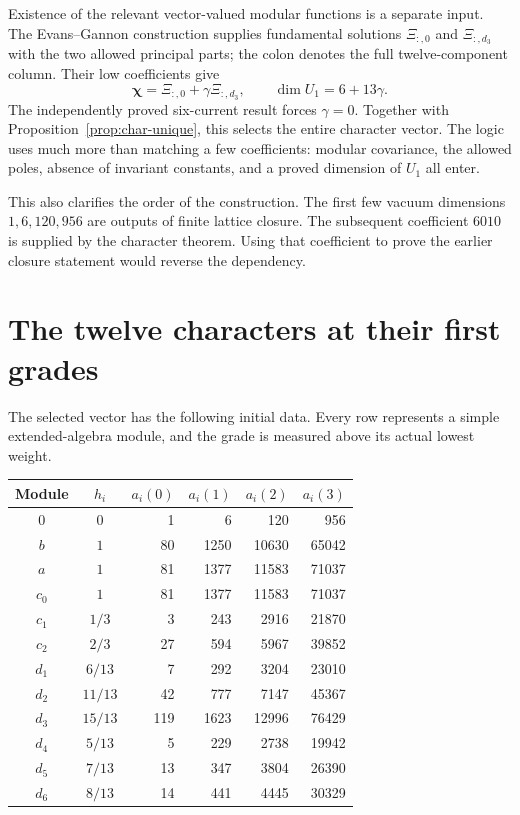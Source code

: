 Existence of the relevant vector-valued modular functions is a
separate input. The Evans--Gannon construction supplies fundamental
solutions $\Xi_{:,0}$ and $\Xi_{:,d_3}$ with the two allowed
principal parts; the colon denotes the full twelve-component column.
Their low coefficients give
\begin{equation}
 \boldsymbol\chi=\Xi_{:,0}+\gamma\Xi_{:,d_3},
 \qquad \dim U_1=6+13\gamma.
 \label{eq:char-gamma}
\end{equation}
The independently proved six-current result forces $\gamma=0$.
Together with Proposition~\ref{prop:char-unique}, this selects the
entire character vector. The logic uses much more than matching a
few coefficients: modular covariance, the allowed poles, absence of
invariant constants, and a proved dimension of $U_1$ all enter.

This also clarifies the order of the construction. The first few
vacuum dimensions $1,6,120,956$ are outputs of finite lattice
closure. The subsequent coefficient $6010$ is supplied by the
character theorem. Using that coefficient to prove the earlier
closure statement would reverse the dependency.

\section{The twelve characters at their first grades}

The selected vector has the following initial data. Every row
represents a simple extended-algebra module, and the grade is
measured above its actual lowest weight.
\begin{center}\small
\begin{tabular}{c|c|rrrr}
\toprule
Module&$h_i$&$a_i(0)$&$a_i(1)$&$a_i(2)$&$a_i(3)$\\
\midrule
$0$&$0$&1&6&120&956\\
$b$&$1$&80&1250&10630&65042\\
$a$&$1$&81&1377&11583&71037\\
$c_0$&$1$&81&1377&11583&71037\\
$c_1$&$1/3$&3&243&2916&21870\\
$c_2$&$2/3$&27&594&5967&39852\\
$d_1$&$6/13$&7&292&3204&23010\\
$d_2$&$11/13$&42&777&7147&45367\\
$d_3$&$15/13$&119&1623&12996&76429\\
$d_4$&$5/13$&5&229&2738&19942\\
$d_5$&$7/13$&13&347&3804&26390\\
$d_6$&$8/13$&14&441&4445&30329\\
\bottomrule
\end{tabular}
\end{center}

